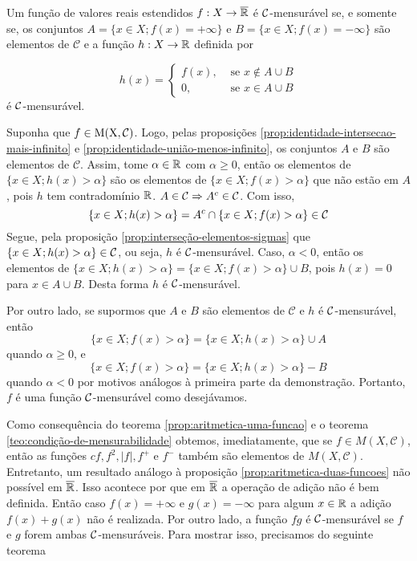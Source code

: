     \begin{theorem}
    \label{teo:condição-de-mensurabilidade}
        Um função de valores reais estendidos $f: X \to \operatorname{\overline{\mathbb{R}}}$ é $\operatorname{\mathcal{C}}$-mensurável se, e somente se, os conjuntos 
        $A = \{ x \in X; f(x) = +\infty\}$ e $B = \{x \in X; f(x) = -\infty\}$
		 são elementos de $\mathcal{C}$ e a função $h: X \to \mathbb{R}$ definida por
		 
		 $$
		 h(x) = \left\{\begin{array}{cc}
		     f(x), & \textrm{\ se } x \notin A\cup B  \\
		      0,& \textrm{\ se } x \in A\cup B
		 \end{array}\right.
		 $$
		 é $\operatorname{\mathcal{C}}$-mensurável.
	 \end{theorem}
\begin{prova}
    Suponha que $f \in \operatorname{M(X, \mathcal{C} )}$. 
    Logo, pelas proposições \ref{prop:identidade-intersecao-mais-infinito} e \ref{prop:identidade-união-menos-infinito}, os conjuntos $A$ e $B$ são elementos de $\mathcal{C}$.
    Assim, tome $\alpha \in \mathbb{R}$ com $\alpha \geq 0$, então os elementos de $\{x \in X; h(x) > \alpha\}$ são os elementos de $\{x \in X; f(x) > \alpha\}$ que não estão em $A$, pois $h$ tem contradomínio $\mathbb{R}$.
    $A \in \operatorname{\mathcal{C}} \Rightarrow A^c \in \operatorname{\mathcal{C}}$. 
    Com isso, 
    $$
    \{x \in X; h(x) > \alpha\} = A^c\cap \{x \in X; f(x) > \alpha\} \in \operatorname{\mathcal{C}}
    $$
    Segue, pela proposição \ref{prop:interseção-elementos-sigmas} que $\{x \in X; h(x) > \alpha\} \in \operatorname{\mathcal{C}}$, ou seja, $h$ é $\operatorname{\mathcal{C}}$-mensurável.
    Caso, $\alpha < 0$, então os elementos de $\{x \in X; h(x) > \alpha\} = \{x \in  X ; f(x) > \alpha\} \cup B $, pois $h(x) = 0$ para $x \in A \cup B$.
    Desta forma $h$ é $\operatorname{\mathcal{C}}$-mensurável.

    Por outro lado, se supormos que $A$ e $B$ são elementos de $\mathcal{C}$ e $h$ é $\operatorname{\mathcal{C}}$-mensurável, então
    $$\{x \in X; f(x) > \alpha\} = \{x \in  X ; h(x) > \alpha\} \cup A $$
    quando $\alpha \geq 0$, e 
    $$\{x \in X; f(x) > \alpha\} = \{x \in  X ; h(x) > \alpha\} - B $$
    quando  $\alpha < 0$ por motivos análogos à primeira parte da demonstração.
    Portanto, $f$ é uma função $\operatorname{\mathcal{C}}$-mensurável como desejávamos.
\end{prova}

Como consequência do teorema \ref{prop:aritmetica-uma-funcao} e o teorema \ref{teo:condição-de-mensurabilidade} obtemos, imediatamente, que se $ f \in M(X,\mathcal{C})$, então as funções $cf, f^2, |f|, f^+$ e $f^-$ também são elementos de $M(X, \mathcal{C})$.
Entretanto, um resultado análogo à proposição \ref{prop:aritmetica-duas-funcoes} não possível em $\operatorname{\overline{\mathbb{R}}}$.
Isso acontece por que em $\operatorname{\overline{\mathbb{R}}}$ a operação de adição não é bem definida.
Então caso $f(x) = +\infty$ e $g(x) = -\infty$ para algum $x \in \mathbb{R}$ a adição
$f(x) + g(x)$ não é realizada.
Por outro lado, a função $fg$ é $\operatorname{\mathcal{C}}$-mensurável se $f$ e $g$ forem ambas $\operatorname{\mathcal{C}}$-mensuráveis.
Para mostrar isso, precisamos do seguinte teorema

